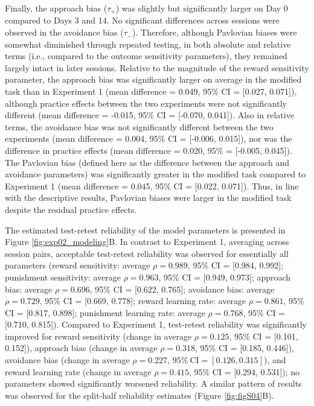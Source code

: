 \documentclass[a4paper,12pt]{article}
\begin{document}
\begin{refsection}[main]
Finally, the approach bias ($\tau_+$) was slightly but significantly larger on Day 0 compared to Days 3 and 14. No significant differences across sessions were observed in the avoidance bias ($\tau_-$). Therefore, although Pavlovian biases were somewhat diminished through repeated testing, in both absolute and relative terms (i.e., compared to the outcome sensitivity parameters), they remained largely intact in later sessions. Relative to the magnitude of the reward sensitivity parameter, the approach bias was significantly larger on average in the modified task than in Experiment 1 (mean difference = 0.049, 95\% CI = [0.027, 0.071]), although practice effects between the two experiments were not significantly different (mean difference = -0.015, 95\% CI = [-0.070, 0.041]). Also in relative terms, the avoidance bias was not significantly different between the two experiments (mean difference = 0.004, 95\% CI = [-0.006, 0.015]), nor was the difference in practice effects (mean difference = 0.020, 95\% = [-0.005, 0.045]). The Pavlovian bias (defined here as the difference between the approach and avoidance parameters) was significantly greater in the modified task compared to Experiment 1 (mean difference = 0.045, 95\% CI = [0.022, 0.071]). Thus, in line with the descriptive results, Pavlovian biases were larger in the modified task despite the residual practice effects. 

The estimated test-retest reliability of the model parameters is presented in Figure \ref{fig:exp02_modeling}B. In contrast to Experiment 1, averaging across session pairs, acceptable test-retest reliability was observed for essentially all parameters (reward sensitivity: average $\rho = 0.989$, 95\% CI = [0.984, 0.992]; punishment sensitivity: average $\rho = 0.963$, 95\% CI = [0.949, 0.973]; approach bias: average $\rho = 0.696$, 95\% CI = [0.622, 0.765]; avoidance bias: average $\rho = 0.729$, 95\% CI = [0.669, 0.778]; reward learning rate: average $\rho = 0.861$, 95\% CI = [0.817, 0.898]; punishment learning rate: average $\rho = 0.768$, 95\% CI = [0.710, 0.815]). Compared to Experiment 1, test-retest reliability was significantly improved for reward sensitivity (change in average $\rho = 0.125$, 95\% CI = [0.101, 0.152]), approach bias (change in average $\rho = 0.318$, 95\% CI = [0.185, 0.446]), avoidance bias (change in average $\rho = 0.227$, $95\% \ \text{CI} = [0.126, 0.315]$), and reward learning rate (change in average $\rho = 0.415$, 95\% CI = [0.294, 0.531]); no parameters showed significantly worsened reliability. A similar pattern of results was observed for the split-half reliability estimates (Figure \ref{fig:figS04}B).


\end{refsection}
\end{document}
